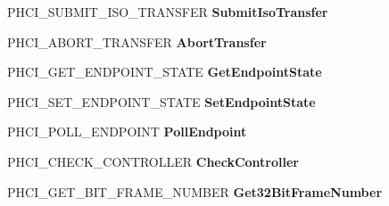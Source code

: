 \begin{DoxyCompactItemize}
\item 
\mbox{\label{struct___u_s_b_p_o_r_t___r_e_g_i_s_t_r_a_t_i_o_n___p_a_c_k_e_t_a112bb507b7e7b3bd03d3e223072d9e0f}} 
P\+H\+C\+I\+\_\+\+S\+U\+B\+M\+I\+T\+\_\+\+I\+S\+O\+\_\+\+T\+R\+A\+N\+S\+F\+ER {\bfseries Submit\+Iso\+Transfer}
\item 
\mbox{\label{struct___u_s_b_p_o_r_t___r_e_g_i_s_t_r_a_t_i_o_n___p_a_c_k_e_t_a4dc62c92e973dde81f5c260e9ff4f6e6}} 
P\+H\+C\+I\+\_\+\+A\+B\+O\+R\+T\+\_\+\+T\+R\+A\+N\+S\+F\+ER {\bfseries Abort\+Transfer}
\item 
\mbox{\label{struct___u_s_b_p_o_r_t___r_e_g_i_s_t_r_a_t_i_o_n___p_a_c_k_e_t_ae97619c01c1dd97d5ffd23242857e657}} 
P\+H\+C\+I\+\_\+\+G\+E\+T\+\_\+\+E\+N\+D\+P\+O\+I\+N\+T\+\_\+\+S\+T\+A\+TE {\bfseries Get\+Endpoint\+State}
\item 
\mbox{\label{struct___u_s_b_p_o_r_t___r_e_g_i_s_t_r_a_t_i_o_n___p_a_c_k_e_t_ab3d628a81cfd196c763a34bff1a1ef87}} 
P\+H\+C\+I\+\_\+\+S\+E\+T\+\_\+\+E\+N\+D\+P\+O\+I\+N\+T\+\_\+\+S\+T\+A\+TE {\bfseries Set\+Endpoint\+State}
\item 
\mbox{\label{struct___u_s_b_p_o_r_t___r_e_g_i_s_t_r_a_t_i_o_n___p_a_c_k_e_t_ae1490637a623a648152237789a9e7011}} 
P\+H\+C\+I\+\_\+\+P\+O\+L\+L\+\_\+\+E\+N\+D\+P\+O\+I\+NT {\bfseries Poll\+Endpoint}
\item 
\mbox{\label{struct___u_s_b_p_o_r_t___r_e_g_i_s_t_r_a_t_i_o_n___p_a_c_k_e_t_a93f802133655c5899e1e14e6b0a66756}} 
P\+H\+C\+I\+\_\+\+C\+H\+E\+C\+K\+\_\+\+C\+O\+N\+T\+R\+O\+L\+L\+ER {\bfseries Check\+Controller}
\item 
\mbox{\label{struct___u_s_b_p_o_r_t___r_e_g_i_s_t_r_a_t_i_o_n___p_a_c_k_e_t_a971a3db1c3ad9f95de2e8fe1095f4d14}} 
P\+H\+C\+I\+\_\+\+G\+E\+T\+\_\+B\+I\+T\+\_\+\+F\+R\+A\+M\+E\+\_\+\+N\+U\+M\+B\+ER {\bfseries Get32\+Bit\+Frame\+Number}

\end{DoxyCompactItemize}
